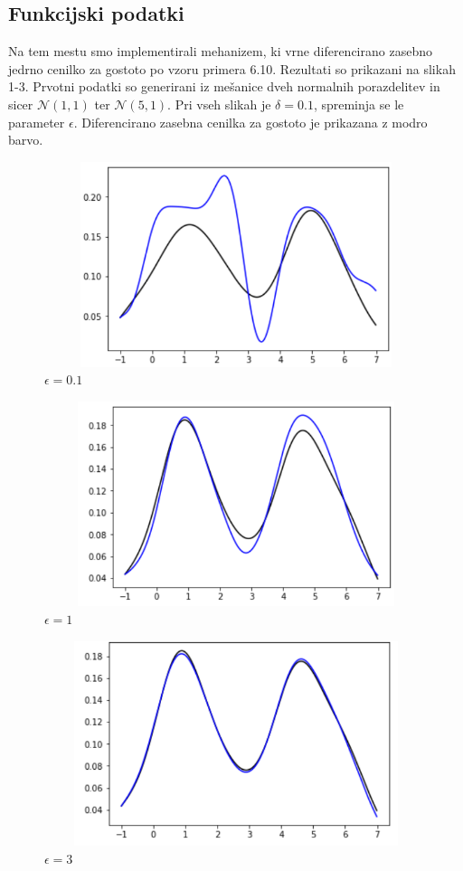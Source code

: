 \documentclass[12pt,a4paper]{amsart}
\theoremstyle{definition} %
\theoremstyle{plain} %
\begin{document}
\subsection{Funkcijski podatki}

Na tem mestu smo implementirali mehanizem, ki vrne diferencirano zasebno jedrno cenilko za gostoto po vzoru primera 6.10. Rezultati so prikazani na slikah 1-3. Prvotni podatki so generirani iz mešanice dveh normalnih porazdelitev in sicer $\mathcal{N}(1,1)$ ter $\mathcal{N}(5,1)$. Pri vseh slikah je $\delta = 0.1$, spreminja se le parameter $\epsilon$. Diferencirano zasebna cenilka za gostoto je prikazana z modro barvo.

\begin{figure}[!htb]
\centering
\caption{$\epsilon = 0.1$}
\includegraphics[width = 12cm, height = 6cm]{prva}
\end{figure}

\begin{figure}[!htb]
\centering
\caption{$\epsilon = 1$}
\includegraphics[width = 12cm, height = 6cm]{druga}
\end{figure}

\begin{figure}[!htb]
\centering
\caption{$\epsilon = 3$}
\includegraphics[width = 12cm, height = 6cm]{tretja}
\end{figure}
\end{document}
